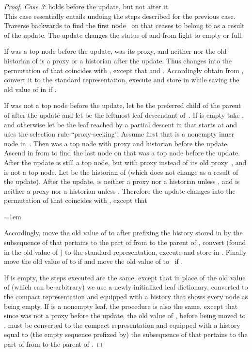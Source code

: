 \documentclass[envcountsame,envcountsect,undated,nolinenumbers]{lnthi}
\begin{document}
\begin{proof}
\medskip
\emph{Case 3}:
 holds before the update, but not after it.\\
This case essentially entails undoing the steps
described for the previous case.
Traverse  backwards to find the first node~
on  that ceases to belong to  as a result of the update.
The update changes the status of  and 
from light to empty or full.

If  was a top node before the update,
 was its proxy, and neither  nor the
old historian  of  is a proxy or a
historian after the update.
Thus  changes into the permutation
 of  that coincides with ,
except that
 and
.
Accordingly obtain  from ,
convert it to the standard representation,
execute 
and store  in  while
saving the old value of  in  if .

If  was not a top node before the update,
let  be the preferred child of the parent of
 after the update and let 
be the leftmost leaf descendant of~.
If  is empty take , and otherwise let
 be the leaf reached by
a partial descent in  that starts at 
and uses the selection rule ``proxy-seeking''.
Assume first that  is a nonempty inner node in~.
Then  was a top node with proxy 
and historian  before the update.
Ascend in  from  to find the last node 
on  that was a top node before the update.
After the update  is still a top node, but
with proxy  instead of its old proxy~,
and  is not a top node.
Let  be the historian of 
(which does not change as a result of the update).
After the update,  is neither a proxy nor a historian
unless , and  is neither a proxy nor
a historian unless .
Therefore the update changes  into the
permutation  of  that coincides
with , except that

\medskip

\centerline{\vbox{\tabskip=1em}}

\medskip
\noindent
Accordingly, 
move the old value of  to 
after prefixing the history stored
in  by the subsequence of  that pertains to
the part of  from  to the parent of ,
convert  (found in the old value of )
to the standard representation,
execute 
and store  in .
Finally move the old value of  to  if 
and move the old value of  to~
if .

If  is empty, the steps executed are the same,
except that in place of the old value of 
(which can be arbitrary) we use a newly initialized
leaf dictionary, converted to the compact representation
and equipped with a history that shows every node
as being empty.
If  is a nonempty leaf, the procedure is also the same, except that
since  was not a proxy before the update, the old value of ,
before being moved to , must be converted
to the compact representation and equipped
with a history equal to (the empty sequence prefixed by)
the subsequence of  that pertains to
the part of  from  to the parent of .


\end{proof}
\end{document}
